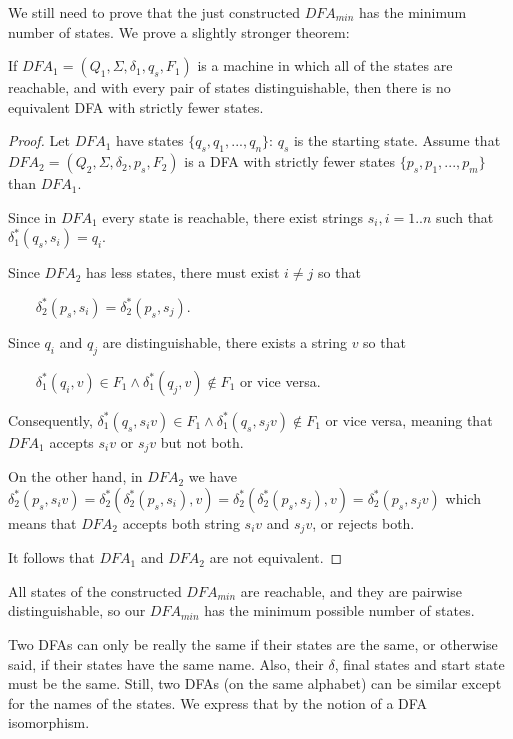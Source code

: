 
We still need to prove that the just constructed $DFA_{min}$ has the
minimum number of states. We prove a slightly stronger theorem:

\begin{theorem}
If $DFA_1 = (Q_1,\Sigma,\delta_1,q_s,F_1)$ is a machine in which all of the
states are reachable, and with every pair of states distinguishable,
then there is no equivalent DFA with strictly fewer states.
\end{theorem}
\begin{proof}
Let $DFA_1$ have states $\{q_s,q_1,...,q_n\}$: $q_s$ is the starting
state. Assume that
%
$DFA_2 = (Q_2,\Sigma,\delta_2,p_s,F_2)$ is a DFA with strictly fewer
states $\{p_s,p_1,...,p_m\}$ than $DFA_1$.

Since in $DFA_1$ every state is reachable, there exist strings $s_i,
i=1..n$ such that
%
$\delta_1^*(q_s,s_i) = q_i$.


Since $DFA_2$ has less states, there must exist $i \neq j$ so that

$~~~~~~~~~\delta_2^*(p_s,s_i) = \delta_2^*(p_s,s_j)$.


Since $q_i$ and $q_j$ are distinguishable, there exists a string $v$
so that


$~~~~~~~~~\delta_1^*(q_i,v) \in F_1 \wedge \delta_1^*(q_j,v) \notin F_1$ or vice versa.

Consequently,
%
$\delta_1^*(q_s,s_iv) \in F_1 \wedge \delta_1^*(q_s,s_jv) \notin F_1$
or vice versa, meaning that $DFA_1$ accepts $s_iv$ or $s_jv$ but not
both.


On the other hand, in $DFA_2$ we have
$\delta_2^*(p_s,s_iv) = \delta_2^*(\delta_2^*(p_s,s_i),v) =
\delta_2^*(\delta_2^*(p_s,s_j),v) = \delta_2^*(p_s,s_jv)$
which means that $DFA_2$ accepts both string $s_iv$ and $s_jv$,
or rejects both.

It follows that $DFA_1$ and $DFA_2$ are not equivalent.
\end{proof}

All states of the constructed $DFA_{min}$ are reachable, and they are
pairwise distinguishable, so our $DFA_{min}$ has the minimum possible
number of states.



Two DFAs can only be really the same if their states are the same, or
otherwise said, if their states have the same name. Also, their
$\delta$, final states and start state must be the same. Still, two
DFAs (on the same alphabet) can be similar except for the names of the
states. We express that by the notion of a DFA isomorphism.

